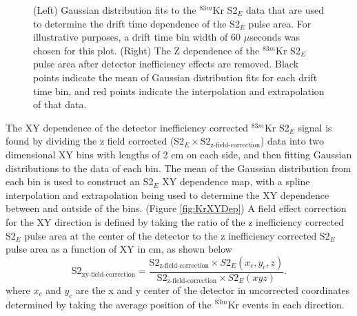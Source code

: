 \documentclass[a4paper,12pt]{article}
\begin{document}
{\begin{figure} 
\centering
{}
\qquad
{}
\caption{ (Left) Gaussian distribution fits to the $^{83m}$Kr S2$_E$ data that are used to determine the drift time dependence of the S2$_E$ pulse area. For illustrative purposes, a drift time bin width of 60 $\mu$seconds was chosen for this plot. (Right) The Z dependence of the $^{83m}$Kr S2$_E$ pulse area after detector inefficiency effects are removed.  Black points indicate the mean of Gaussian distribution fits for each drift time bin, and red points indicate the interpolation and extrapolation of that data.}
\label{fig:GaussianPlot}
\end{figure}


The XY dependence of the detector inefficiency corrected $^{83m}$Kr S2$_E$ signal is found by dividing the z field corrected (S2$_E \times \mbox{S}2_{\mbox{z-field-correction}}$) data into two dimensional XY bins with lengths of 2 cm on each side, and then fitting Gaussian distributions to the data of each bin.  The mean of the Gaussian distribution from each bin is used to construct an S2$_E$ XY dependence map, with a spline interpolation and extrapolation being used to determine the XY dependence between and outside of the bins. (Figure \ref{fig:KrXYDep}) A field effect correction for the XY direction is defined by taking the ratio of the z inefficiency corrected S2$_E$ pulse area at the center of the detector to the z inefficiency corrected S2$_E$ pulse area as a function of XY in cm, as shown below
\begin{equation}
\mbox{S}2_{\mbox{xy-field-correction}} = \frac{\mbox{S}2_{\mbox{z-field-correction}}\times S2_E(x_c,y_c,z)}{\mbox{S}2_{\mbox{z-field-correction}}\times S2_E(xyz)}.
\end{equation} 
where $x_c$ and $y_c$ are the x and y center of the detector in uncorrected coordinates determined by taking the average position of the $^{83m}$Kr events in each direction.

}
\end{document}
